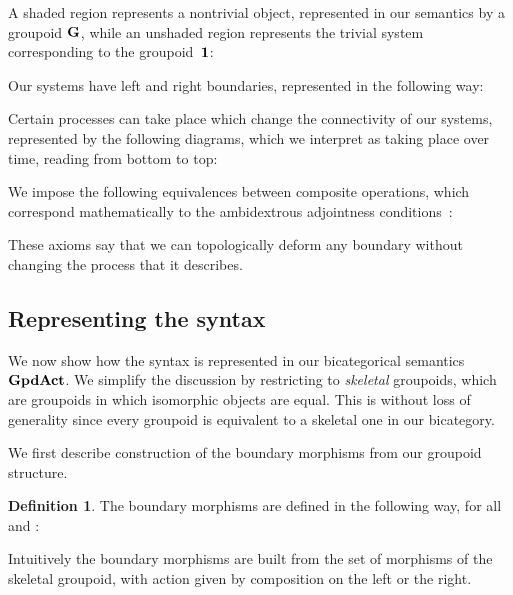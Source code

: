 \documentclass[a4paper,12pt]{article}
\theoremstyle{definition}
\newtheorem{defn}[theorem]{Definition}
\newcommand\cat[1]{{\ensuremath{\bf #1}}}
\renewcommand{\-}[0]{\nobreakdash-\hspace{0pt}}
\newcommand\GA{\cat{GpdAct}{}}
\def\innerboxsep{3pt}
\begin{document}
A shaded region represents a nontrivial object, represented in our semantics by a groupoid \cat G, while an unshaded region represents the trivial system corresponding to the groupoid~\cat 1:

Our systems have left and right boundaries, represented in the following way:

Certain processes can take place which change the connectivity of our systems, represented by the following diagrams, which we interpret as taking place over time, reading from bottom to top:


\noindent
We impose the following equivalences between composite operations, which correspond mathematically to the ambidextrous adjointness conditions~\citep{l06-faaa}:
\def\innerboxsep{8pt}
\def\compactwidthscale{0.55}
\def\compactheightscale{0.7}
\def\drawspecialboxA{    \draw [black!20]
        ([xshift=-\compactheightscale*\innerboxsep, yshift=-\compactwidthscale*\innerboxsep] -3,0)
        rectangle
        ([xshift=\compactheightscale*\innerboxsep, yshift=\compactwidthscale*\innerboxsep] 1,2);}
\def\drawspecialboxB{    \draw [black!20]
        ([xshift=-\compactheightscale*\innerboxsep, yshift=-\compactwidthscale*\innerboxsep] -1,0)
        rectangle
        ([xshift=\compactheightscale*\innerboxsep, yshift=\compactwidthscale*\innerboxsep] 1,2);}

These axioms say that we can topologically deform any boundary without changing the process that it describes.

\subsection{Representing the syntax}
\label{sec:representation}

\noindent
We now show how the syntax is represented in our bicategorical semantics \GA. We simplify the discussion by restricting to \textit{skeletal} groupoids, which are groupoids in which isomorphic objects are equal. This is without loss of generality since every groupoid is equivalent to a skeletal one in our bicategory.

We first describe construction of the boundary morphisms from our groupoid structure.
\begin{defn}
The boundary morphisms are defined in the following way, for all  and :

\end{defn}

\noindent
Intuitively the boundary morphisms are built from the set of morphisms of the skeletal groupoid, with action given by composition on the left or the right.
\end{document}
